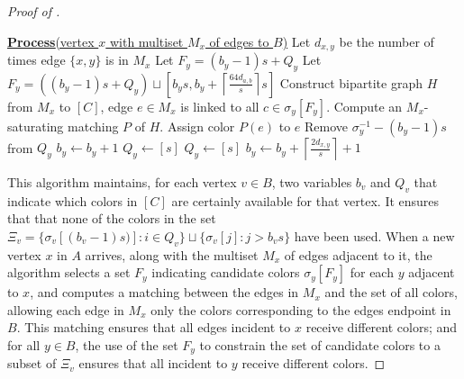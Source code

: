 \documentclass[10pt]{article}
\theoremstyle{definition}\newtheorem{definition}[lemma]{Definition}
\theoremstyle{remark}  \newtheorem*{remark}{Remark}
\newcommand{\ceil}[1]{{\left\lceil{#1}\right\rceil}}
\begin{document}
\begin{proof}[Proof of ]
\begin{algorithm}[htb!]
\begin{algorithmic}[1]
    \Statex \underline{\textbf{Process}(vertex $x$ with multiset $M_x$ of edges to $B$)}
      \Statex Let $d_{x,y}$ be the number of times edge $\{x,y\}$ is in $M_x$
          \State Let $F_y = (b_y -1) s + Q_y$\label{step:bpt-det-va-edgecol-low-deg-fy}
        \Else
          \State Let $F_y = ((b_y -1) s + Q_y) \sqcup [b_y s, b_y + \ceil{\frac{64 d_{a,b}}{s}} s]$\label{step:bpt-det-va-edgecol-high-deg-fy}
        \EndIf
      \EndFor
      \State Construct bipartite graph $H$ from $M_x$ to $[C]$, edge $e \in M_x$
      is linked to all $c \in \sigma_y[F_y]$.\label{step:bpt-det-va-edgecol-match-graph}
      \State Compute an $M_x$-saturating matching $P$ of $H$. \label{step:bpt-det-va-edgecol-compute-matching}
        \State Assign color $P(e)$ to $e$
          \State Remove $\sigma_y^{-1} - (b_y - 1)s$ from $Q_y$
        \EndIf
      \EndFor
            \State $b_y \gets b_y + 1$ \label{step:bpt-det-va-edgecol-small-block}
            \State $Q_y \gets [s]$
          \EndIf
        \Else
          \State $Q_y \gets [s]$
          \State $b_y \gets b_y + \ceil{\frac{2 d_{x,y}}{s}} + 1$\label{step:bpt-det-va-edgecol-large-block}
        \EndIf
      \EndFor

    \end{algorithmic}
  \end{algorithm}
  
  This algorithm maintains, for each vertex $v\in B$, two variables $b_v$ and $Q_v$ that
  indicate which colors in $[C]$ are certainly available for that vertex. It ensures that
  that none of the colors in the set $\Xi_v = \{\sigma_v[(b_v - 1) s)] : i \in Q_v\} \sqcup \{\sigma_v[j] : j > b_v s\}$ have been used. When a new vertex $x$ in $A$ arrives, along with the multiset $M_x$
  of edges adjacent to it, the algorithm selects a set $F_y$ indicating candidate colors $\sigma_y[F_y]$ for each $y$ adjacent to $x$, and computes a matching between the edges in $M_x$ and the
  set of all colors, allowing each edge in $M_x$ only the colors corresponding to the edges endpoint in $B$. This matching ensures that all edges incident to $x$ receive different colors;
  and for all $y \in B$, the use of the set $F_y$ to constrain the set of candidate colors
  to a subset of $\Xi_v$ ensures that all incident to $y$ receive different colors.
  

\end{proof}
\end{document}
